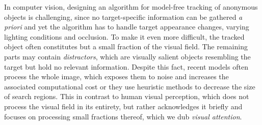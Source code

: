     In computer vision, designing an algorithm for model-free tracking of anonymous objects is challenging, since no target-specific information can be gathered \emph{a priori} and yet the algorithm has to handle target appearance changes, varying lighting conditions and occlusion. 
    To make it even more difficult, the tracked object often constitutes but a small fraction of the visual field. 
    The remaining parts may contain \emph{distractors}, which are visually salient objects resembling the target but hold no relevant information. 
    Despite this fact, recent models often process the whole image,
    which exposes them to noise
    and increases the associated computational cost or they use heuristic methods to decrease the size of search regions. 
    This in contrast to human visual perception, which does not process the visual field in its entirety, but rather acknowledges it briefly and focuses on processing small fractions thereof, which we dub \emph{visual attention}.
    
